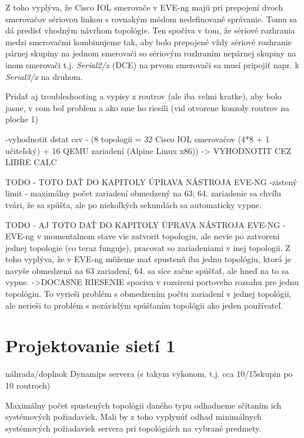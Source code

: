Z toho vyplýva, že Cisco IOL smerovače v EVE-ng majú pri prepojení dvoch smerovačov sériovou linkou s rovnakým módom nedefinované správanie. Tomu sa dá predísť vhodným návrhom topológie. Ten spočíva v tom, že sériové rozhrania medzi smerovačmi kombinujeme tak, aby bolo prepojené vždy sériové rozhranie párnej skupiny na jednom smerovači so sériovým rozhraním nepárnej skupiny na inom smerovači t.j. \emph{Serial2/x} (DCE) na prvom smerovači sa musí pripojiť napr. k \emph{Serial3/x} na druhom.

Pridať aj troubleshooting a vypisy z routrov (ale iba velmi kratke), aby bolo jasne, v com bol problem a ako sme ho riesili (vid otvorene konzoly routrov na ploche 1)
  
  

-vyhodnotit dstat csv - (8 topologii = 32 Cisco IOL smerovačov (4*8 + 1 učiteľský) + 16 QEMU zariadení (Alpine Linux x86))
        -> VYHODNOTIT CEZ LIBRE CALC
        
    
    
{\huge TODO - TOTO DAŤ DO KAPITOLY ÚPRAVA NÁSTROJA EVE-NG}
-zistený limit - maximálny počet zariadení obmedzený na 63; 64. zariadenie sa chvíľu tvári, že sa spúšťa, ale po niekoľkých sekundách sa automaticky vypne.

{\huge TODO - AJ TOTO DAŤ DO KAPITOLY ÚPRAVA NÁSTROJA EVE-NG}
-EVE-ng v momentalnom stave vie zatvorit topologiu, ale nevie po zatvoreni jednej topologie (co teraz funguje), pracovat so zariadeniami v inej topologii. Z toho vyplýva, že v EVE-ng môžeme mať spustenú iba jednu topológiu, ktorá je navyše obmedzená na 63 zariadení, 64. sa síce začne spúšťať, ale hneď na to sa vypne.
    ->DOCASNE RIESENIE spociva v rozsireni portoveho rozsahu pre jednu topológiu. To vyrieši problém s obmedzením počtu zariadení v jednej topológii, ale nerieši to problém s nezávislým spúšťaním topológii ako jeden používateľ.



\section{Projektovanie sietí 1}

náhrada/doplnok Dynamips servera (s takym vykonom, t.j. cca 10/15skupin po 10 routroch)


Maximálny počet spustených topológii daného typu odhadneme sčítaním ich systémových požiadaviek. Mali by z toho vyplynúť odhad minimálnych systémových požiadaviek servera pri topológiách na vybrané predmety.



